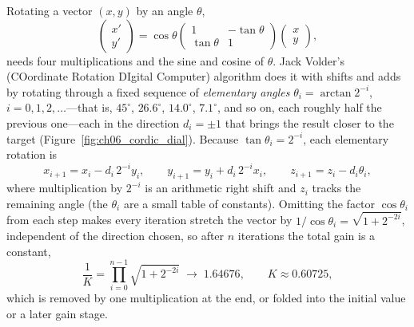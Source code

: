 
Rotating a vector $(x,y)$ by an angle $\theta$,
\[
\begin{pmatrix}x'\\y'\end{pmatrix}=\cos\theta\begin{pmatrix}1&-\tan\theta\\ \tan\theta&1\end{pmatrix}
\begin{pmatrix}x\\y\end{pmatrix},
\]
needs four multiplications and the sine and cosine of $\theta$. Jack Volder's  (COordinate
Rotation DIgital Computer) algorithm does it with shifts and adds by rotating through a fixed
sequence of \emph{elementary angles} $\theta_i=\arctan2^{-i}$, $i=0,1,2,\dots$---that is, $45^\circ$,
$26.6^\circ$, $14.0^\circ$, $7.1^\circ$, and so on, each roughly half the previous one---each in the
direction $d_i=\pm1$ that brings the result closer to the target (Figure~\ref{fig:ch06_cordic_dial}).
Because $\tan\theta_i=2^{-i}$, each elementary rotation is
\begin{equation}
x_{i+1}=x_i-d_i\,2^{-i}y_i,\qquad y_{i+1}=y_i+d_i\,2^{-i}x_i,\qquad z_{i+1}=z_i-d_i\theta_i,
\label{eq:ch06:cordic}
\end{equation}
where multiplication by $2^{-i}$ is an arithmetic right shift and $z_i$ tracks the remaining angle
(the $\theta_i$ are a small table of constants). Omitting the factor $\cos\theta_i$ from each step
makes every iteration stretch the vector by $1/\cos\theta_i=\sqrt{1+2^{-2i}}$, independent of the
direction chosen, so after $n$ iterations the total gain is a constant,
\begin{equation}
\frac1K=\prod_{i=0}^{n-1}\sqrt{1+2^{-2i}}\;\longrightarrow\;1.64676,\qquad K\approx0.60725,
\end{equation}
which is removed by one multiplication at the end, or folded into the initial value or a later
gain stage.


